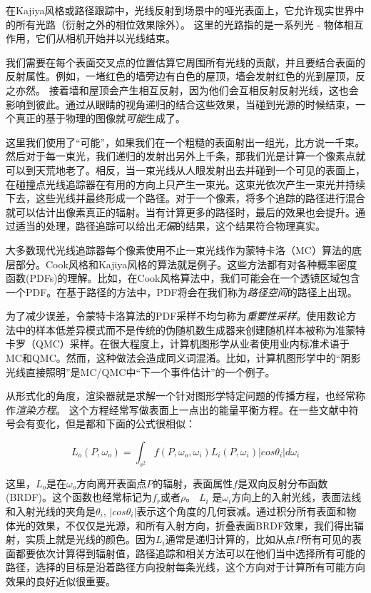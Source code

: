 \documentclass[12pt]{article}
\begin{document}
在Kajiya风格或路径跟踪中，光线反射到场景中的哑光表面上，它允许现实世界中的所有光路（衍射之外的相位效果除外）。 这里的光路指的是一系列光 - 物体相互作用，它们从相机开始并以光线结束。

我们需要在每个表面交叉点的位置估算它周围所有光线的贡献，并且要结合表面的反射属性。例如，一堵红色的墙旁边有白色的屋顶，墙会发射红色的光到屋顶，反之亦然。 接着墙和屋顶会产生相互反射，因为他们会互相反射反射光线，这也会影响到彼此。通过从眼睛的视角递归的结合这些效果，当碰到光源的时候结束，一个真正的基于物理的图像就\textit{可能}生成了。

这里我们使用了“可能”，如果我们在一个粗糙的表面射出一组光，比方说一千束。然后对于每一束光，我们递归的发射出另外上千条，那我们光是计算一个像素点就可以到天荒地老了。相反，当一束光线从人眼发射出去并碰到一个可见的表面上，在碰撞点光线追踪器在有用的方向上只产生一束光。这束光依次产生一束光并持续下去，这些光线并最终形成一个路径。对于一个像素，将多个追踪的路径进行混合就可以估计出像素真正的辐射。当有计算更多的路径时，最后的效果也会提升。通过适当的处理，路径追踪可以给出\textit{无偏}的结果，这个结果符合物理真实。

大多数现代光线追踪器每个像素使用不止一束光线作为蒙特卡洛（MC）算法的底层部分。Cook风格和Kajiya风格的算法就是例子。这些方法都有对各种概率密度函数(PDFs)的理解。比如，在Cook风格算法中，我们可能会在一个透镜区域包含一个PDF。在基于路径的方法中，PDF将会在我们称为\textit{路径空间}的路径上出现。

为了减少误差，令蒙特卡洛算法的PDF采样不均匀称为\textit{重要性采样}。使用数论方法中的样本低差异模式而不是传统的伪随机数生成器来创建随机样本被称为准蒙特卡罗（QMC）采样。在很大程度上，计算机图形学从业者使用业内标准术语于MC和QMC。然而，这种做法会造成同义词混淆。比如，计算机图形学中的“阴影光线直接照明”是MC/QMC中“下一个事件估计”的一个例子。

从形式化的角度，渲染器就是求解一个针对图形学特定问题的传播方程，也经常称作\textit{渲染方程}。 这个方程经常写做表面上一点出的能量平衡方程。在一些文献中符号会有变化，但是都和下面的公式很相似：

\begin{equation}
L_o(P, \omega_o) = \int_{s^2} f(P, \omega_o,\omega_i)L_i(P,\omega_i) |cos\theta_i|d\omega_i
\end{equation}

这里，$L_o$是在$\omega_o$方向离开表面点$P$的辐射，表面属性$f$是双向反射分布函数(BRDF)。这个函数也经常标记为$f_r$或者$\rho$。 $L_i$ 是$\omega_i$方向上的入射光线，表面法线和入射光线的夹角是$\theta_i$, $|cos \theta_i|$表示这个角度的几何衰减。通过积分所有表面和物体光的效果，不仅仅是光源，和所有入射方向，折叠表面BRDF效果，我们得出辐射，实质上就是光线的颜色。因为$L_i$通常是递归计算的，比如从点$P$所有可见的表面都要依次计算得到辐射值，路径追踪和相关方法可以在他们当中选择所有可能的路径，选择的目标是沿着路径方向投射每条光线，这个方向对于计算所有可能方向效果的良好近似很重要。
\end{document}
